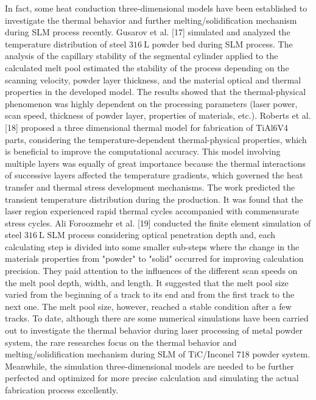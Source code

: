 \documentclass[10pt]{article}
\begin{document}
In fact, some heat conduction three-dimensional models have been established to investigate the thermal behavior and further melting/solidification mechanism during SLM process recently. Gusarov et al. [17] simulated and analyzed the temperature distribution of steel $316 \mathrm{~L}$ powder bed during SLM process. The analysis of the capillary stability of the segmental cylinder applied to the calculated melt pool estimated the stability of the process depending on the scanning velocity, powder layer thickness, and the material optical and thermal properties in the developed model. The results showed that the thermal-physical phenomenon was highly dependent on the processing parameters (laser power, scan speed, thickness of powder layer, properties of materials, etc.). Roberts et al. [18] proposed a three dimensional thermal model for fabrication of TiAl6V4 parts, considering the temperature-dependent thermal-physical properties, which is beneficial to improve the computational accuracy. This model involving multiple layers was equally of great importance because the thermal interactions of successive layers affected the temperature gradients, which governed the heat transfer and thermal stress development mechanisms. The work predicted the transient temperature distribution during the production. It was found that the laser region experienced rapid thermal cycles accompanied with commensurate stress cycles. Ali Foroozmehr et al. [19] conducted the finite element simulation of steel $316 \mathrm{~L}$ SLM process considering optical penetration depth and, each calculating step is divided into some smaller sub-steps where the change in the materials properties from "powder" to "solid" occurred for improving calculation precision. They paid attention to the influences of the different scan speeds on the melt pool depth, width, and length. It suggested that the melt pool size varied from the beginning of a track to its end and from the first track to the next one. The melt pool size, however, reached a stable condition after a few tracks. To date, although there are some numerical simulations have been carried out to investigate the thermal behavior during laser processing of metal powder system, the rare researches focus on the thermal behavior and melting/solidification mechanism during SLM of TiC/Inconel 718 powder system. Meanwhile, the simulation three-dimensional models are needed to be further perfected and optimized for more precise calculation and simulating the actual fabrication process excellently.
\end{document}
